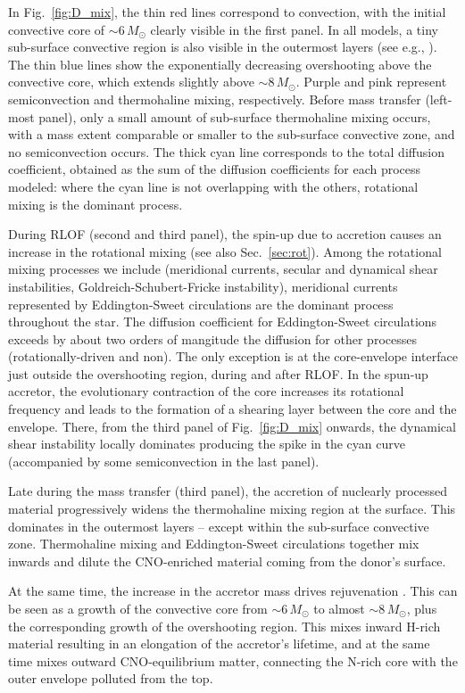 \documentclass[twocolumn,twocolappendix,trackchanges]{aastex63}
\DeclareRobustCommand{\Figref}[1]{Fig.~\ref{#1}}
\DeclareRobustCommand{\Secref}[1]{Sec.~\ref{#1}}
\begin{document}
In \Figref{fig:D_mix}, the thin red lines correspond to convection,
with the initial convective core of
$\sim$$6\,M_\odot$ clearly visible in the first panel. In all models, a tiny sub-surface convective region is also visible in the outermost layers (see e.g., \citealt{cantiello:21}).  The thin blue lines show the exponentially decreasing overshooting above the convective core, which extends slightly above
$\sim$8\,$M_\odot$. Purple and pink represent semiconvection and thermohaline mixing, respectively. Before mass transfer (left-most panel), only a small amount of sub-surface thermohaline mixing occurs, with a mass extent comparable or smaller to the sub-surface convective zone, and no semiconvection occurs. The thick cyan line corresponds to the total diffusion coefficient, obtained as the sum of the diffusion coefficients for each process modeled: where the cyan line is not overlapping with the others, rotational mixing is the dominant process.

During RLOF (second and third panel), the spin-up due to accretion causes an increase in the rotational mixing (see also \Secref{sec:rot}). Among the rotational mixing processes we include (meridional currents, secular and dynamical shear instabilities, Goldreich-Schubert-Fricke instability), meridional currents represented by Eddington-Sweet circulations are the dominant process throughout the star. The diffusion coefficient for Eddington-Sweet circulations exceeds by about two orders of mangitude the diffusion for other processes (rotationally-driven and non). The only exception is at the core-envelope interface just outside the overshooting region, during and after RLOF. In the spun-up accretor, the evolutionary contraction of the core increases its rotational frequency and leads to the formation of a shearing layer between the core and the envelope. There, from the third panel of \Figref{fig:D_mix} onwards, the dynamical shear instability locally dominates producing the spike in the cyan curve (accompanied by some semiconvection in the last panel).

Late during the mass transfer (third panel), the accretion of
nuclearly processed material progressively widens the thermohaline
mixing region at the surface.  This dominates in the outermost layers
-- except within the sub-surface convective zone. Thermohaline mixing
and Eddington-Sweet circulations together mix inwards and dilute the
CNO-enriched material coming from the donor's surface.

At the same time, the increase in the accretor mass drives
rejuvenation \citep[e.g.,][]{schneider:16}. This can be seen as a
growth of the convective core from
$\sim$$6\,M_\odot$ to almost $\sim$$8\,M_\odot$, plus the
corresponding growth of the overshooting region. This mixes inward
H-rich material resulting in an elongation of the accretor's lifetime,
and at the same time mixes outward CNO-equilibrium matter, connecting
the N-rich core with the outer envelope polluted from the top.
\end{document}

